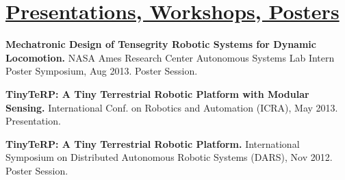 \documentclass[12pt,letterpaper]{deedy-resume} %
\begin{document}
\begin{minipage}[t][6.8in][t]{0.66\textwidth}
{\begin{tightitemize}
\end{tightitemize}

\sectionspace


\section{\quad \underline{Presentations, Workshops, Posters}}

\vspace{0.4cm}
\begin{tightitemize}

\item \textbf{Mechatronic Design of Tensegrity Robotic Systems for Dynamic Locomotion.} NASA Ames Research Center Autonomous Systems Lab Intern Poster Symposium, Aug 2013. Poster Session.

\item \textbf{TinyTeRP: A Tiny Terrestrial Robotic Platform with Modular Sensing.} International Conf. on Robotics and Automation (ICRA), May 2013. Presentation.

\item \textbf{TinyTeRP: A Tiny Terrestrial Robotic Platform.} International Symposium on Distributed Autonomous Robotic Systems (DARS), Nov 2012. Poster Session.

\end{tightitemize}


}
\end{minipage}%

\vspace{0.45cm}
\end{document}
